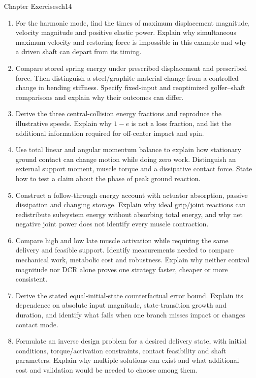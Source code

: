 \begin{exercises}{Chapter Exercises}{ch14}
\begin{enumerate}[leftmargin=*,itemsep=8pt,topsep=4pt]
\item For the harmonic mode, find the times of maximum displacement magnitude, velocity magnitude and positive elastic power. Explain why simultaneous maximum velocity and restoring force is impossible in this example and why a driven shaft can depart from its timing.

\item Compare stored spring energy under prescribed displacement and prescribed force. Then distinguish a steel/graphite material change from a controlled change in bending stiffness. Specify fixed-input and reoptimized golfer--shaft comparisons and explain why their outcomes can differ.

\item Derive the three central-collision energy fractions and reproduce the illustrative speeds. Explain why $1-e$ is not a loss fraction, and list the additional information required for off-center impact and spin.

\item Use total linear and angular momentum balance to explain how stationary ground contact can change motion while doing zero work. Distinguish an external support moment, muscle torque and a dissipative contact force. State how to test a claim about the phase of peak ground reaction.

\item Construct a follow-through energy account with actuator absorption, passive dissipation and changing storage. Explain why ideal grip/joint reactions can redistribute subsystem energy without absorbing total energy, and why net negative joint power does not identify every muscle contraction.

\item Compare high and low late muscle activation while requiring the same delivery and feasible support. Identify measurements needed to compare mechanical work, metabolic cost and robustness. Explain why neither control magnitude nor DCR alone proves one strategy faster, cheaper or more consistent.

\item Derive the stated equal-initial-state counterfactual error bound. Explain its dependence on absolute input magnitude, state-transition growth and duration, and identify what fails when one branch misses impact or changes contact mode.

\item Formulate an inverse design problem for a desired delivery state, with initial conditions, torque/activation constraints, contact feasibility and shaft parameters. Explain why multiple solutions can exist and what additional cost and validation would be needed to choose among them.

\end{enumerate}
\end{exercises}
\cleardoublepage
